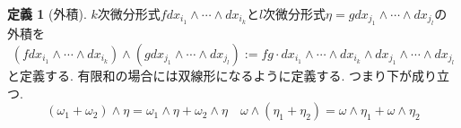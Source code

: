 \documentclass[dvipdfmx,a4paper,11pt]{article}
\theoremstyle{definition}
\newtheorem{dfn}[thm]{定義}
\begin{document}
    
 \begin{tcolorbox}[
    colback = white,
    colframe = green!35!black,
    fonttitle = \bfseries,
    breakable = true]
\begin{dfn}[外積]
$k$次微分形式$f d x_{i_1}\wedge \cdots \wedge dx_{i_k}$と$l$次微分形式$\eta = g d x_{j_1} \wedge \cdots \wedge dx_{j_l}$の外積を
$$
(f d x_{i_1}\wedge \cdots \wedge dx_{i_k})
\wedge
( g d x_{j_1} \wedge \cdots \wedge dx_{j_l})
:=
 f g \cdot  d x_{i_1} \wedge \cdots \wedge dx_{i_k}\wedge d x_{j_1} \wedge \cdots \wedge dx_{j_l}
$$
と定義する. 有限和の場合には双線形になるように定義する. つまり下が成り立つ.
$$
(\omega_1 + \omega_2) \wedge \eta = \omega_1  \wedge \eta  + \omega_2 \wedge \eta
\quad 
 \omega \wedge (\eta_1 + \eta_2) = \omega  \wedge \eta_1 + \omega \wedge \eta_2
$$

    \end{dfn}
    \end{tcolorbox}
    
\end{document}
